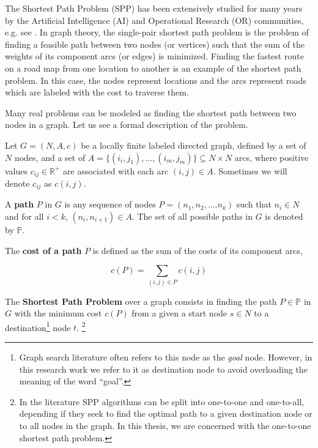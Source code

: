 The Shortest Path Problem (SPP) has been extensively studied for many years by the Artificial Intelligence (AI) and Operational Research (OR) communities, e.g. see \citep{Pearl1984, Gallo1988, Ahuja1990, Cherkassky1996}. In graph theory, the single-pair shortest path problem is the problem of finding a feasible path between two nodes (or vertices) such that the sum of the weights of its component arcs (or edges) is minimized. Finding the fastest route on a road map from one location to another is an example of the shortest path problem. In this case, the nodes represent locations and the arcs represent roads which are labeled with the cost to traverse them. 

Many real problems can be modeled as finding the shortest path between two nodes in a graph. Let us see a formal description of the problem.

Let $G =(N,A,c)$ be a locally finite labeled directed graph, defined by a set of
$N$ nodes, and a set of $A = \{ (i_i,j_1),...,(i_m,j_m) \} \subseteq N \times N$ arcs, where positive values $c_{ij} \in \mathbb{R}^{+}$ are associated with each arc $(i,j) \in A$. Sometimes we will denote $c_{ij}$ as $c(i,j)$.

\begin{defi}\label{chapMultiObjAlg:def:singleObjpath}
A \textbf{path} $P$  in $G$ is any sequence of nodes $P = (n_1, n_2,....n_k)$ such that $n_i \in N$ and for all $i < k$, $(n_i, n_{i+1}) \in A$. The set of all possible paths in $G$ is denoted by $\mathbb{P}$. 
\end{defi}

\begin{defi}\label{chapMultiObjAlg:def:singleObjcostpath}
The \textbf{cost of a path} $P$ is defined as the
sum of the costs of its component arcs,

\begin{equation}\label{chapMultiObjAlg:eq:singleObjaddCostPath}
    c(P) = \sum_{(i,j) \in P}{c(i,j)}
\end{equation}
\end{defi}

\begin{defi}\label{chapMultiObjAlg:def:singleObjSearchProb}
The \textbf{Shortest Path Problem} over a graph consists in finding the path $P\in \mathbb{P}$ in $G$ with the minimum cost $c(P)$ from a given a start node $s \in N$ to a destination\footnote{Graph search literature often refers to this node as the \emph{goal} node. However, in this research work we refer to it as destination node to avoid overloading the meaning of the word ``goal''. } node $t$. \footnote{In the literature SPP algorithms can be split into one-to-one and one-to-all, depending if they seek to find the optimal path to a given destination node or to all nodes in the graph. In this thesis, we are concerned with the one-to-one shortest path problem.}
\end{defi}


